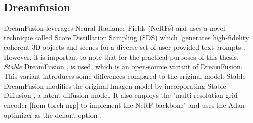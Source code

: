 \subsection{Dreamfusion}
\label{dreamfusion}
DreamFusion leverages Neural Radiance Fields (NeRFs) \citep{mildenhallNERF} and uses a novel technique called Score Distillation Sampling (SDS) \citep{pooleDreamfusion} which "generates high-fidelity coherent 3D objects and scenes for a diverse set of user-provided text prompts \citep{pooleDreamfusion}. However, it is important to note that for the practical purposes of this thesis, \emph{Stable} DreamFusion \citep{stable-dreamfusion}, is used,  which is an open-source variant of DreamFusion. This variant introduces some differences compared to the original model. Stable DreamFusion modifies the original Imagen model by incorporating Stable Diffusion \citep{rombachStableDiffusion}, a latent diffusion model. It also employs the "multi-resolution grid encoder [from torch-ngp] to implement the NeRF backbone" \citep{stable-dreamfusion} and uses the Adan optimizer as the default option \citep{stable-dreamfusion}.